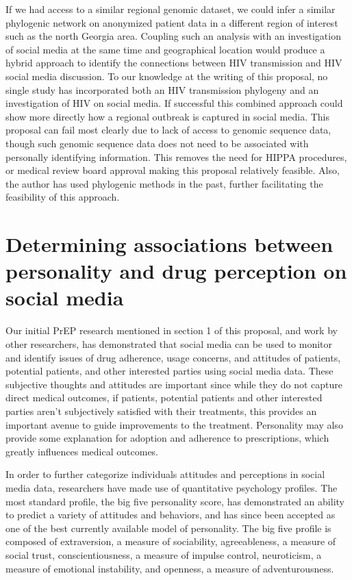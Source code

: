 If we had access to a similar regional genomic dataset, we could infer a similar phylogenic network on anonymized patient data in a different region of interest such as the north Georgia area. Coupling such an analysis with an investigation of social media at the same time and geographical location would produce a hybrid approach to identify the connections between HIV transmission and HIV social media discussion. To our knowledge at the writing of this proposal, no single study has incorporated both an HIV transmission phylogeny and an investigation of HIV on social media. If successful this combined approach could show more directly how a regional outbreak is captured in social media. This proposal can fail most clearly due to lack of access to genomic sequence data, though such genomic sequence data does not need to be associated with personally identifying information. This removes the need for HIPPA procedures, or medical review board approval making this proposal relatively feasible. Also, the author has used phylogenic methods in the past, further facilitating the feasibility of this approach.

\section{Determining associations between personality and drug perception on social media}

Our initial PrEP research mentioned in section 1 of this proposal, and work by other researchers, has demonstrated that social media can be used to monitor and identify issues of drug adherence, usage concerns, and attitudes of patients, potential patients, and other interested parties using social media data. These subjective thoughts and attitudes are important since while they do not capture direct medical outcomes, if patients, potential patients and other interested parties aren't subjectively satisfied with their treatments, this provides an important avenue to guide improvements to the treatment. Personality may also provide some explanation for adoption and adherence to prescriptions, which greatly influences medical outcomes.

In order to further categorize individuals attitudes and perceptions in social media data, researchers have made use of quantitative psychology profiles. The most standard profile, the big five personality score\cite{gosling2003very}, has demonstrated an ability to predict a variety of attitudes and behaviors, and has since been accepted as one of the best currently available model of personality. The big five profile is composed of extraversion, a measure of sociability, agreeableness, a measure of social trust, conscientiousness, a measure of impulse control, neuroticism, a measure of emotional instability, and openness, a measure of adventurousness.


